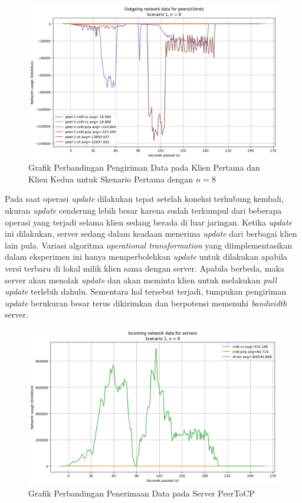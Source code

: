\begin{figure}
 \centering
 \includegraphics[width=15cm]{./assets/skripsi/benchmark-vis_cell_2_output_25}
 \caption{Grafik Perbandingan Pengiriman Data pada Klien Pertama dan Klien Kedua untuk Skenario Pertama dengan $n = 8$}
 \label{fig:2-25}
\end{figure}

Pada saat operasi \textit{update} dilakukan tepat setelah koneksi terhubung kembali, ukuran \textit{update} cenderung lebih besar karena sudah terkumpul dari beberapa operasi yang terjadi selama klien sedang berada di luar jaringan. Ketika \textit{update} ini dilakukan, server sedang dalam keadaan menerima \textit{update} dari berbagai klien lain pula. Variasi algoritma \textit{operational transformation} yang diimplementasikan dalam eksperimen ini hanya memperbolehkan \textit{update} untuk dilakukan apabila versi terbaru di lokal milik klien sama dengan server. Apabila berbeda, maka server akan menolak \textit{update} dan akan meminta klien untuk melakukan \textit{pull update} terlebih dahulu. Sementara hal tersebut terjadi, tumpukan pengiriman \textit{update} berukuran besar terus dikirimkan dan berpotensi memenuhi \textit{bandwidth} server.

\begin{figure}
 \centering
 \includegraphics[width=15cm]{./assets/skripsi/benchmark-vis_cell_2_output_24}
 \caption{Grafik Perbandingan Penerimaan Data pada Server PeerToCP}
 \label{fig:2-24}
\end{figure}

